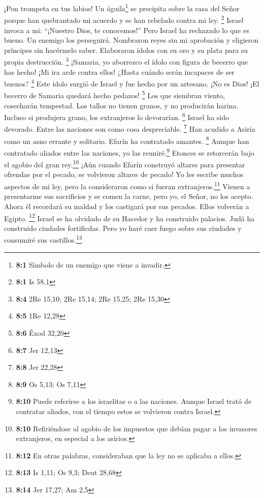  ¡Pon trompeta en tus labios! Un águila\footnote{\textbf{8:1}
  Símbolo de un enemigo que viene a invadir.} se precipita sobre la casa
del Señor porque han quebrantado mi acuerdo y se han rebelado contra mi
ley. \footnote{\textbf{8:1} Is 58,1}  Israel invoca a mi:
``¡Nuestro Dios, te conocemos!''  Pero Israel ha rechazado
lo que es bueno. Un enemigo los perseguirá.  Nombraron
reyes sin mi aprobación y eligieron príncipes sin hacérmelo saber.
Elaboraron ídolos con su oro y su plata para su propia destrucción.
\footnote{\textbf{8:4} 2Re 15,10; 2Re 15,14; 2Re 15,25; 2Re 15,30}
 ¡Samaria, yo aborrezco el ídolo con figura de becerro que
has hecho! ¡Mi ira arde contra ellos! ¿Hasta cuándo serán incapaces de
ser buenos? \footnote{\textbf{8:5} 1Re 12,28}  Este ídolo
surgió de Israel y fue hecho por un artesano. ¡No es Dios! ¡El becerro
de Samaria quedará hecho pedazos! \footnote{\textbf{8:6} Éxod 32,20}
 Los que siembran viento, cosecharán tempestad. Los tallos
no tienen granos, y no producirán harina. Incluso si produjera grano,
los extranjeros lo devorarían. \footnote{\textbf{8:7} Jer 12,13}
 Israel ha sido devorado. Entre las naciones son como cosa
despreciable. \footnote{\textbf{8:8} Jer 22,28}  Han
acudido a Asiria como un asno errante y solitario. Efarín ha contratado
amantes. \footnote{\textbf{8:9} Os 5,13; Os 7,11}  Aunque
han contratado aliados entre las naciones, yo las reuniré.\footnote{\textbf{8:10}
  Puede referirse a los israelitas o a las naciones. Aunque Israel trató
  de contratar aliados, con el tiempo estos se volvieron contra Israel.}
Etonces se retorcerán bajo el agobio del gran rey.\footnote{\textbf{8:10}
  Refiriéndose al agobio de los impuestos que debían pagar a los
  invasores extranjeros, en especial a los asirios.} 
¡Aún cuando Efarín construyó altares para presentar ofrendas por el
pecado, se volvieron altares de pecado!  Yo les escribe
muchos aspectos de mi ley, pero la consideraron como si fueran
extranjeros.\footnote{\textbf{8:12} En otras palabras, consideraban que
  la ley no se aplicaba a ellos.}  Vienen a presentarme
sus sacrificios y se comen la carne, pero yo, el Señor, no los acepto.
Ahora él recordará su maldad y los castigará por sus pecados. Ellos
volverán a Egipto. \footnote{\textbf{8:13} Is 1,11; Os 9,3; Deut 28,68}
 Israel se ha olvidado de su Hacedor y ha construido
palacios. Judá ha construido ciudades fortificdas. Pero yo haré caer
fuego sobre sus ciudades y consumiré sus castillos.\footnote{\textbf{8:14}
  Jer 17,27; Am 2,5}


